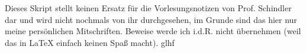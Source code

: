 \documentclass{jvfscript-de}
\begin{document}
	\frontmatter
	\maketitle
	
	\tableofcontents
	\newpage
	\thispagestyle{plain}
	Dieses Skript stellt keinen Ersatz für die Vorlesungsnotizen von Prof. Schindler dar und wird nicht nochmals von ihr durchgesehen, im Grunde sind das hier nur meine persönlichen Mitschriften. Beweise werde ich i.d.R. nicht übernehmen (weil das in \LaTeX{} einfach keinen Spaß macht). \hspace{\fill} glhf
	\newpage
	\mainmatter
	
	
	
	
	
%	
%	
%	
%	
%	
%	
%	
%	
%	
%	
%	
	
	
	
	
	
	
	\appendix
	\renewcommand{\appendixtocname}{Anhang}
	\addappheadtotoc
	\printindex
	\printindex[lecture]
\end{document}
